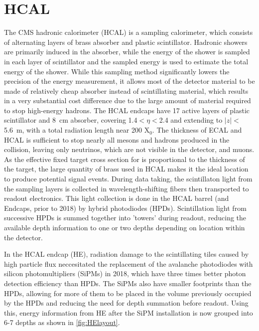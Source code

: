 \section{HCAL}
The CMS hadronic calorimeter (HCAL) is a sampling calorimeter, which consists of alternating layers of brass absorber and plastic scintillator. 
Hadronic showers are primarily induced in the absorber, while the energy of the shower is sampled in each layer of scintillator and the sampled energy is used to estimate the total energy of the shower. 
While this sampling method significantly lowers the precision of the energy measurement, it allows most of the detector material to be made of relatively cheap absorber instead of scintillating material, which results in a very substantial cost difference due to the large amount of material required to stop high-energy hadrons.
The HCAL endcaps have 17 active layers of plastic scintillator and \SI{8}{\centi\meter} absorber, covering 1.4$<\eta<$2.4 and extending to $\lvert z \rvert<$ \SI{5.6}{\meter}, with a total radiation length near 200 X$_0$. 
The thickness of ECAL and HCAL is sufficient to stop nearly all mesons and hadrons produced in the collision, leaving only neutrinos, which are not visible in the detector, and muons. 
As the effective fixed target cross section for \dbrem is proportional to the thickness of the target, the large quantity of brass used in HCAL makes it the ideal location to produce potential signal events.
During data taking, the scintillaton light from the sampling layers is collected in wavelength-shifting fibers then transported to readout electronics.
This light collection is done in the HCAL barrel (and Endcaps, prior to 2018) by hybrid photodiodes (HPDs). 
Scintillation light from successive HPDs is summed together into 'towers' during readout, reducing the available depth information to one or two depths depending on location within the detector.

In the HCAL endcap (HE), radiation damage to the scintillating tiles caused by high particle flux neccesitated the replacement of the avalanche photodiodes with silicon photomultipliers (SiPMs) in 2018, which have three times better photon detection efficiency than HPDs.  
The SiPMs also have smaller footprints than the HPDs, allowing for more of them to be placed in the volume previously occupied by the HPDs and reducing the need for depth summation before readout. 
Using this, energy information from HE after the SiPM installation is now grouped into 6-7 depths as shown in \cref{fig:HElayout}.


